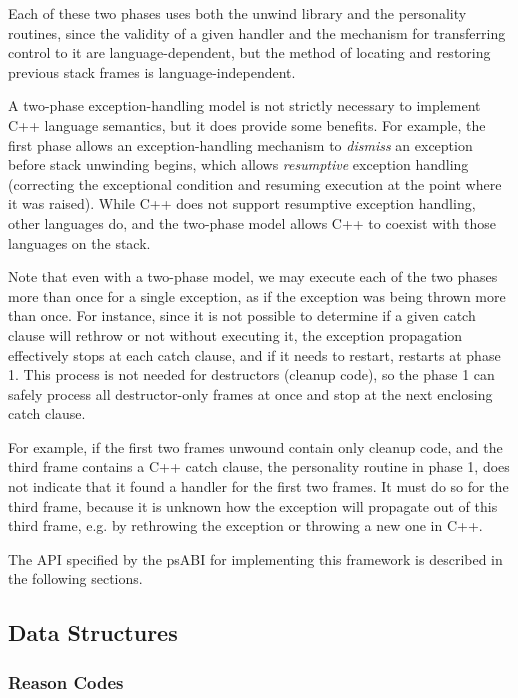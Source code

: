 Each of these two phases uses both the unwind library and the personality
routines, since the validity of a given handler and the mechanism for
transferring control to it are language-dependent, but the method of
locating and restoring previous stack frames is language-independent.

A two-phase exception-handling model is not strictly necessary to
implement C++ language semantics, but it does provide some benefits. For
example, the first phase allows an exception-handling mechanism to
\emph{dismiss} an exception before stack unwinding begins, which allows
\emph{resumptive} exception handling (correcting the exceptional condition
and resuming execution at the point where it was raised). While C++ does
not support resumptive exception handling, other languages do, and the
two-phase model allows C++ to coexist with those languages on the stack.

Note that even with a two-phase model, we may execute each of the two
phases more than once for a single exception, as if the exception was
being thrown more than once. For instance, since it is not possible to
determine if a given catch clause will rethrow or not without executing
it, the exception propagation effectively stops at each catch clause,
and if it needs to restart, restarts at phase 1. This process is not
needed for destructors (cleanup code), so the phase 1 can safely process
all destructor-only frames at once and stop at the next enclosing
catch clause.

For example, if the first two frames unwound contain only cleanup code,
and the third frame contains a C++ catch clause, the personality routine
in phase 1, does not indicate that it found a handler for the first two
frames. It must do so for the third frame, because it is unknown how the
exception will propagate out of this third frame, e.g. by rethrowing the
exception or throwing a new one in C++.

The API specified by the \xARCH psABI for implementing this framework
is described in the following sections.

\subsection{Data Structures}

\subsubsection{Reason Codes}

